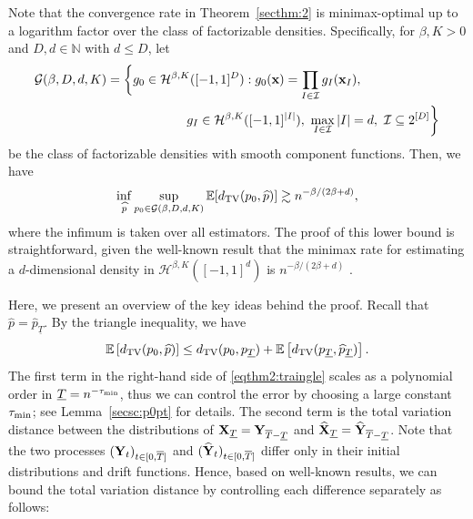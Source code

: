 \documentclass[twoside,11pt]{article}
\def\cG{\mathcal G}
\def\cH{\mathcal H}
\def\cI{\mathcal I}
\newcommand{\bx}{{\bf x}}
\newcommand{\bX}{{\bf X}}
\newcommand{\bY}{{\bf Y}}
\newcommand{\bbE}{{\mathbb E}}
\newcommand{\bbN}{{\mathbb N}}
\newcommand{\E}{\mathbb{E}}
\newcommand{\be}{\begin{equation}}
\newcommand{\ee}{\end{equation}}
\newcommand{\bean}{\setlength\arraycolsep{1pt}\begin{eqnarray*}}
\newcommand{\eean}{\end{eqnarray*}}
\begin{document}
Note that the convergence rate in Theorem~\ref{secthm:2} is minimax-optimal up to a logarithm factor over the class of factorizable densities.
Specifically, for $\beta, K > 0$ and $ D, d \in \bbN$ with $d \leq D$, let
\be
\begin{split}
 & \cG ( \beta, D, d, K )
 =
 \bigg\{ g_0 \in \cH^{\beta, K}([-1,1]^{D}):
 g_0(\bx) =  \prod_{I \in \cI} g_{I}(\bx_I),
 \\
 & \qquad\qquad\qquad\qquad\qquad\qquad
 g_{I} \in \cH^{\beta, K} ( [-1,1]^{ \vert I \vert } ),
 ~ \max_{I \in \cI} \vert I \vert = d, 
 ~ \cI \subseteq 2^{[D]}  
 \bigg\} 
 \label{eq:lowbd}
 \end{split}
\ee
be the class of factorizable densities with smooth component functions.
Then, we have
\bean
 \inf_{\widehat p} \sup_{p_0 \in \cG(\beta, D, d, K)} \E [d_{\rm TV}(p_0, \widehat p) ] \gtrsim  n^{-\beta / (2\beta + d)} ,
\eean
where the infimum is taken over all estimators.
The proof of this lower bound is straightforward, given the well-known result that the minimax rate for estimating a $d$-dimensional density in $\cH^{\beta, K}([-1,1]^d)$ is $n^{-\beta / (2\beta + d)}$ \citep{gine2016mathematical}.

Here, we present an overview of the key ideas behind the proof.
Recall that $\widehat p = \widehat p_{\underline{T}}$.
By the triangle inequality, we have
\be
\bbE \left[ d_{\rm TV} (p_{0}, \widehat p ) \right]
\leq d_{\rm TV} (p_{0}, p_{\underline{T}})  
+ \bbE \left[ d_{\rm TV} (p_{\underline{T}},  \widehat p_{\underline{T}}) \right]. \label{eqthm2:traingle}
\ee
The first term in the right-hand side of \eqref{eqthm2:traingle} scales as a polynomial order in $\underline{T} = n^{- \tau_{\rm min}}$, 
thus we can control the error by choosing a large constant $\tau_{\rm min}$; see Lemma~\ref{secsc:p0pt} for details.
The second term is the total variation distance between the distributions of $\bX_{\underline{T}} = \bY_{\overline{T} - \underline{T}}$ and $\widehat \bX_{\underline{T}} = \widehat \bY_{ \overline{T}- \underline{T}}$.
Note that the two processes $(\bY_t)_{t \in [0, \overline{T}]}$ and $(\widehat \bY_t)_{t \in [0, \overline{T}]}$ differ only in their initial distributions and drift functions.
Hence, based on well-known results, we can bound the total variation distance by controlling each difference separately as follows:
\end{document}
